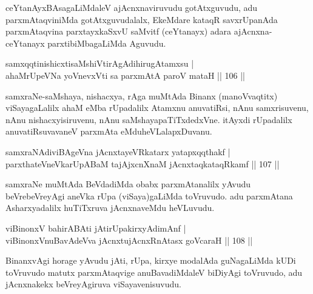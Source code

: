 \begin{artha}
ceYtanAyxBAsagaLiMdaleV ajAcnxnaviruvudu gotAtxguvudu, adu parxmAtaqviniMda gotAtxguvudalalx, EkeMdare kataqR savxrUpanAda parxmAtaqvina parxtayxkaSxvU saMvitf (ceYtanayx) adara ajAcnxna- ceYtanayx parxtibiMbagaLiMda Aguvudu.
\end{artha}


\begin{shl}
samxqqtinishicxtisaMshiVtirAgAdihirugAtamxsu |\\
ahaMrUpeVNa yoV\s nevxVti sa parxmAtA paroV mataH \hfill || 106 ||
\end{shl}

\begin{artha}%
samxraNe-saMshaya, nishacxya, rAga muMtAda Binanx (manoVvaqtitx) viSayagaLalilx ahaM eMba rUpadalilx Atamxnu anuvatiRsi, nAnu samxrisuvenu, nAnu nishacxyisiruvenu, nAnu saMshayapaTiTxdedxVne. itAyxdi rUpadalilx anuvatiRsuvavaneV parxmAta eMdu\break heVLalapxDuvanu.
\end{artha}


\begin{shl}
samxraNAdiviBAgeVna jAcnxtayeVRkatarx yatapxqqthakf |\\
parxthateV\s neVkarUpABaM tajAjxcnXnaM jAcnxtaqkataqRkamf \hfill || 107 ||
\end{shl}

\begin{artha}
samxraNe muMtAda BeVdadiMda obabx parxmAtanalilx yAvudu beVrebeVreyAgi aneVka rUpa (viSaya)gaLiMda toVruvudo. adu parxmAtana Asharxyadalilx huTiTxruva jAcnxnaveMdu heVLuvudu.
\end{artha}


\begin{shl}
viBinonxV bahirABAti jAtirUpakirxyAdimAnf |\\
viBinonxV\s nuBavAdeVva jAcnxtujAcnxRnAtasx goVcaraH \hfill || 108 ||
\end{shl}

\begin{artha}
BinanxvAgi horage yAvudu jAti, rUpa, kirxye modalAda guNagaLiMda kUDi toVruvudo matutx parxmAtaqvige anuBavadiMdaleV biDiyAgi toVruvudo, adu jAcnxnakekx beVreyAgiruva viSayavenisuvudu.
\end{artha}



